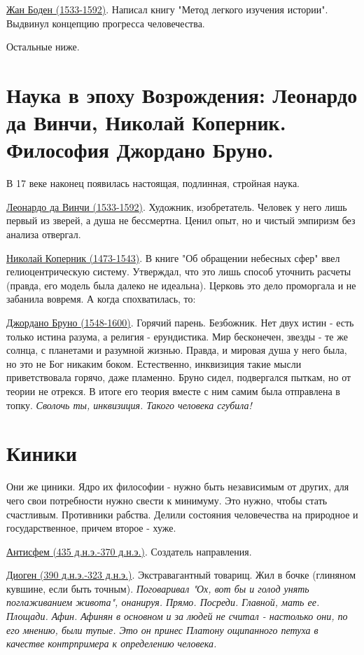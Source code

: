 \documentclass[12pt,a4paper]{article}
\begin{document}
\underline{Жан Боден (1533-1592)}. Написал книгу "Метод легкого изучения истории". Выдвинул концепцию прогресса человечества.

Остальные ниже.

\section{Наука в эпоху Возрождения: Леонардо да Винчи, Николай Коперник. Философия Джордано Бруно.}

В 17 веке наконец появилась настоящая, подлинная, стройная наука. 

\underline{Леонардо да Винчи (1533-1592)}. Художник, изобретатель. Человек у него лишь первый из зверей, а душа не бессмертна. Ценил опыт, но и чистый эмпиризм без анализа отвергал.

\underline{Николай Коперник (1473-1543)}. В книге "Об обращении небесных сфер" ввел гелиоцентрическую систему. Утверждал, что это лишь способ уточнить расчеты (правда, его модель была далеко не идеальна). Церковь это дело проморгала и не забанила вовремя. А когда спохватилась, то:

\underline{Джордано Бруно (1548-1600)}. Горячий парень. Безбожник. Нет двух истин - есть только истина разума, а религия - ерундистика. Мир бесконечен, звезды - те же солнца, с планетами и разумной жизнью. Правда, и мировая душа у него была, но это не Бог никаким боком. Естественно, инквизиция такие мысли приветствовала горячо, даже пламенно. Бруно сидел, подвергался пыткам, но от теории не отрекся. В итоге его теория вместе с ним самим была отправлена в топку. \textit{Сволочь ты, инквизиция. Такого человека сгубила!}

\section{Киники}

Они же циники. Ядро их философии - нужно быть независимым от других, для чего свои потребности нужно свести к минимуму. Это нужно, чтобы стать счастливым.
Противники рабства. Делили состояния человечества на природное и государственное, причем второе - хуже.

\underline{Антисфем (435 д.н.э.-370 д.н.э.)}. Создатель направления.

\underline{Диоген (390 д.н.э.-323 д.н.э.)}. Экстравагантный товарищ. Жил в бочке (глиняном кувшине, если быть точным). \textit{Поговаривал "Ох, вот бы и голод унять поглаживанием живота", онанируя. Прямо. Посреди. Главной, мать ее. Площади. Афин. Афинян в основном и за людей не считал - настолько они, по его мнению, были тупые. Это он принес Платону ощипанного петуха в качестве контрпримера к определению человека.}
\end{document}
